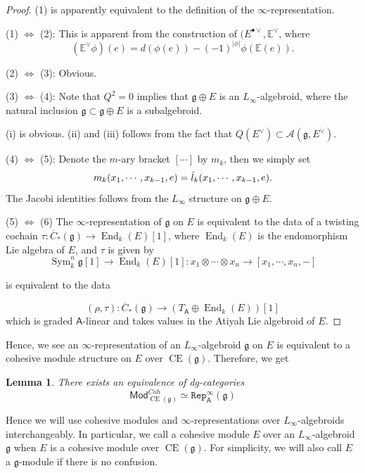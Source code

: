 \documentclass[12pt]{amsart}
\newtheorem{lem}[thm]{Lemma}
\theoremstyle{definition}
\theoremstyle{remark}
\numberwithin{equation}{section}
\newcommand{\CA}{{\mathcal A}}
\newcommand{\1}{{\mathbb{1}}}
\newcommand{\g}{\mathfrak{g}}
\newcommand{\CE}{\operatorname{CE}}
\newcommand{\cohmod}{\mathsf{Mod}^{Coh}}
\newcommand{\repi}{\mathtt{Rep}}
\newcommand{\End}{\operatorname{End}}
\newcommand{\sym}{\operatorname{Sym}}
\begin{document}
 \begin{proof}
 (1) is apparently equivalent to the definition of the $\infty$-representation.
 
 (1) $\Leftrightarrow$ (2): This is apparent from the construction of $(E^{\bullet \vee}, \mathbb{E}^{\vee}$, where 
 $$
 (\mathbb{E}^{\vee}\phi)(e) = d(\phi(e)) - (-1)^{|\phi|} \phi(\mathbb{E}(e)).
 $$
 
  (2) $\Leftrightarrow$ (3): Obvious.
  
  (3) $\Leftrightarrow$ (4): Note that $Q^2 = 0$ implies that $\g \oplus E$ is an $L_{\infty}$-algebroid, where the natural inclusion $\g \subset \g \oplus E$ is a subalgebroid. 
  
  (i) is obvious. (ii) and (iii) follows from the fact that $Q(E^{\vee}) \subset \CA(\g, E^{\vee})$.
  
  
  (4) $\Leftrightarrow$ (5): Denote the $m$-ary bracket $[\cdots]$ by $m_k$, then we simply set
  $$
  m_k(x_1, \cdots, x_{k-1}, e) = \Tilde{l}_k (x_1, \cdots, x_{k-1}, e).
  $$ The Jacobi identities follows from the $L_{\infty}$ structure on $\g \oplus E$.
  
    (5) $\Leftrightarrow$ (6) The $\infty$-representation of $\g$ on $E$ is equivalent to the data of a twisting cochain $\tau: \overline{C}_{*}(\g) \to \End_k(E)[1]$, where $\End_k(E)$ is the endomorphism Lie algebra of $E$, and $\tau$ is given by
    $$
    \sym^n_k \g[1] \to \End_k(E)[1]: x_1\otimes \cdots \otimes x_n \to [x_1, \cdots, x_n, -]
    $$
  
  is equivalent to the data
  
  $$
  (\rho, \tau): \overline{C}_{*}(\g) \to (T_{\mathsf{A}} \oplus \End_k(E))[1]
  $$
  which is graded $\mathsf{A}$-linear and takes values in the Atiyah Lie algebroid of $E$.
 \end{proof}
Hence, we see an $\infty$-representation of an $L_{\infty}$-algebroid $\g$ on $E$ is equivalent to a cohesive module structure on $E$ over $\CE(\g)$. Therefore, we get
\begin{lem}
There exists an equivalence of dg-categories
\begin{equation*}
    \cohmod_{\CE{(\g)}}\simeq \repi_{\mathsf{A}}^{\infty}(\g)
\end{equation*}
\end{lem}
Hence we will use cohesive modules and $\infty$-representations over $L_{\infty}$-algebroids interchangeably. In particular,  we call a cohesive module $E$ over an $L_{\infty}$-algebroid $\g$ when $E$ is a cohesive module over $\CE(\g)$. For simplicity, we will also call $E$ a $\g$-module if there is no confusion. 
\end{document}
